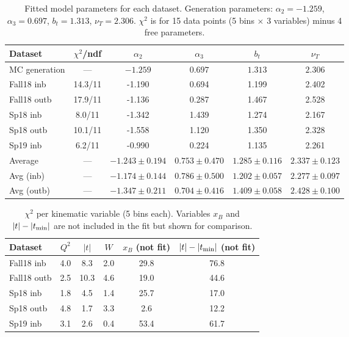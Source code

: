 \documentclass[12pt,a4paper]{article}
\begin{document}
\begin{table}[H]
\centering
\caption{Fitted model parameters for each dataset. Generation parameters:
$\alpha_2 = -1.259$, $\alpha_3 = 0.697$, $b_t = 1.313$, $\nu_T = 2.306$.
$\chi^2$ is for 15 data points (5 bins $\times$ 3 variables) minus 4 free parameters.}
\begin{tabular}{lccccc}
\toprule
Dataset & $\chi^2$/ndf & $\alpha_2$ & $\alpha_3$ & $b_t$ & $\nu_T$ \\
\midrule
MC generation & --- & $-1.259$ & $0.697$ & $1.313$ & $2.306$ \\
\midrule
Fall18 inb & 14.3/11 & -1.190 & 0.694 & 1.199 & 2.402 \\
Fall18 outb & 17.9/11 & -1.136 & 0.287 & 1.467 & 2.528 \\
Sp18 inb & 8.0/11 & -1.342 & 1.439 & 1.274 & 2.167 \\
Sp18 outb & 10.1/11 & -1.558 & 1.120 & 1.350 & 2.328 \\
Sp19 inb & 6.2/11 & -0.990 & 0.224 & 1.135 & 2.261 \\
\midrule
Average & --- & $-1.243 \pm 0.194$ & $0.753 \pm 0.470$ & $1.285 \pm 0.116$ & $2.337 \pm 0.123$ \\
Avg (inb) & --- & $-1.174 \pm 0.144$ & $0.786 \pm 0.500$ & $1.202 \pm 0.057$ & $2.277 \pm 0.097$ \\
Avg (outb) & --- & $-1.347 \pm 0.211$ & $0.704 \pm 0.416$ & $1.409 \pm 0.058$ & $2.428 \pm 0.100$ \\
\bottomrule
\end{tabular}
\end{table}

\begin{table}[H]
\centering
\caption{$\chi^2$ per kinematic variable (5 bins each). Variables $x_B$ and $|t|-|t_{\rm min}|$
are not included in the fit but shown for comparison.}
\begin{tabular}{lccccc}
\toprule
Dataset & $Q^2$ & $|t|$ & $W$ & $x_B$ (not fit) & $|t|-|t_{\rm min}|$ (not fit) \\
\midrule
Fall18 inb & 4.0 & 8.3 & 2.0 & 29.8 & 76.8 \\
Fall18 outb & 2.5 & 10.3 & 4.6 & 19.0 & 44.6 \\
Sp18 inb & 1.8 & 4.5 & 1.4 & 25.7 & 17.0 \\
Sp18 outb & 4.8 & 1.7 & 3.3 & 2.6 & 12.2 \\
Sp19 inb & 3.1 & 2.6 & 0.4 & 53.4 & 61.7 \\
\bottomrule
\end{tabular}
\end{table}
\end{document}
